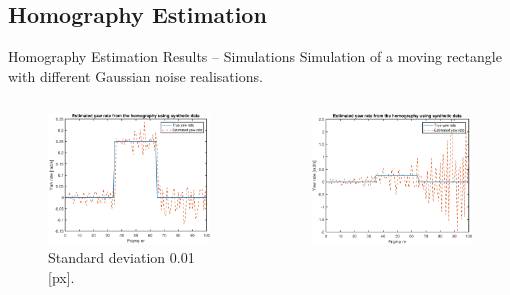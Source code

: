 \documentclass{beamer}
\begin{document}
\subsection{Homography Estimation}

\begin{frame}{Homography Estimation Results -- Simulations}
	Simulation of a moving rectangle with different Gaussian noise realisations.
	\vspace{-2.5em}
	\begin{columns}[T]
	\begin{figure}
		\includegraphics[height=0.375\textheight]{Hom/rect_1e-2}
		\vspace{-1.25em}
		\caption{Standard deviation 0.01 [px].}
	\end{figure}
	\vspace{-2.5em}
	\begin{figure}
		\includegraphics[height=0.375\textheight]{Hom/rect_1e-1}

\end{figure}
\end{columns}
\end{frame}
\end{document}
